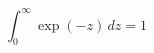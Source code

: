 \documentclass[preview]{standalone}
\begin{document}
$$\int_0^\infty \exp(-z)\,dz=1$$
\end{document}
